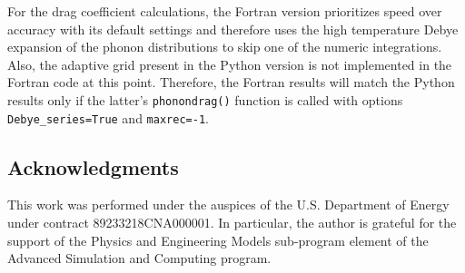 \documentclass[11pt,letterpaper,oneside]{article}
\begin{document}
For the drag coefficient calculations, the Fortran version prioritizes speed over accuracy with its default settings and therefore uses the high temperature Debye expansion of the phonon distributions to skip one of the numeric integrations.
Also, the adaptive grid present in the Python version is not implemented in the Fortran code at this point.
Therefore, the Fortran results will match the Python results only if the latter's \verb|phonondrag()| function is called with options \verb|Debye_series=True| and \verb|maxrec=-1|.



\subsection*{Acknowledgments}

This work was performed under the auspices of the U.S. Department of Energy under contract 89233218CNA000001.
In particular, the author is grateful for the support of the Physics and Engineering Models sub-program element of the Advanced Simulation and Computing program.


\printbibliography
\end{document}
